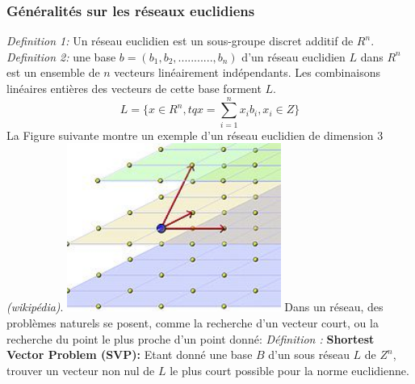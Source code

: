 \documentclass[a4paper,12pt]{report}
\begin{document}
\subsubsection{Généralités sur les réseaux euclidiens}
\textit{ Definition 1:} Un réseau euclidien est un sous-groupe discret additif de $R^n$.\newline
\newline
\textit{ Definition 2:} une base $b= (b_1,b_2,...........,b_n)$  d’un réseau euclidien $L$ dans $R^n$ est un ensemble de $n$ vecteurs 
linéairement indépendants. Les combinaisons linéaires entières des vecteurs de cette base forment $L$.
$$L = \{x\in R^n, tq x = \sum_{i=1}^{n} x_ib_i, x_i\in Z\}$$
La Figure suivante montre un exemple d'un réseau euclidien de dimension 3 \textit{(wikipédia)}.\newline
\newline
\newline    
\hspace*{5cm}{}\includegraphics[width=7cm]{reseau.jpg}
\newline
\newline
Dans un réseau, des problèmes naturels se posent, comme la recherche d’un vecteur court, ou la recherche du point le plus proche d’un point donné: \newline
\textit{Définition :} \textbf{Shortest Vector Problem (SVP):}\newline
Etant donné une base $B$ d’un sous réseau $L$ de $Z^n$, trouver un vecteur non nul de $L$ le plus court possible pour la norme euclidienne.\newline
\newline
\newline
\end{document}

